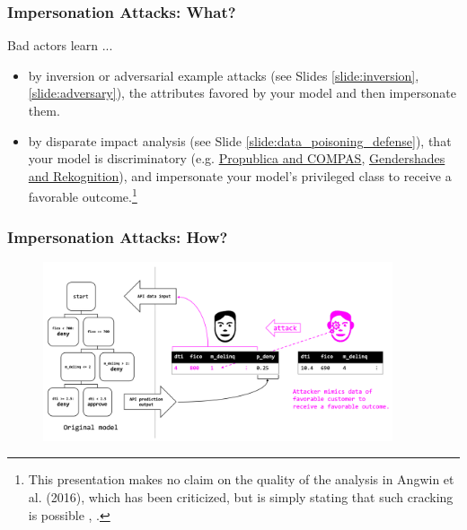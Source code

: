 \documentclass[11pt,
               aspectratio=169,
               hyperref={colorlinks}
               ]{beamer}
\begin{document}
			\begin{frame}
		
				\frametitle{Impersonation Attacks: \textbf{What?}}		
Bad actors learn ... 
				\begin{itemize}
				\large
					\item by inversion or adversarial example attacks (see Slides \ref{slide:inversion}, \ref{slide:adversary}), the attributes favored by your model and then impersonate them.
					\item by disparate impact analysis (see Slide \ref{slide:data_poisoning_defense}), that your model is discriminatory (e.g. \href{https://www.propublica.org/article/machine-bias-risk-assessments-in-criminal-sentencing}{Propublica and COMPAS}, \href{https://medium.com/@Joy.Buolamwini/response-racial-and-gender-bias-in-amazon-rekognition-commercial-ai-system-for-analyzing-faces-a289222eeced}{Gendershades and Rekognition}), and impersonate your model's privileged class to receive a favorable outcome.\footnote{This presentation makes no claim on the quality of the analysis in Angwin et al. (2016), which has been criticized, but is simply stating that such cracking is possible \cite{angwin16,}, \cite{flores2016false}.}
				\end{itemize}
				
			\end{frame}

			\begin{frame}
		
				\frametitle{Impersonation Attacks: \textbf{How?}}		
			
				\begin{figure}[htb]
					\begin{center}
						\includegraphics[height=150pt]{../img/imperson.PNG}
					\end{center}
				\end{figure}	
				
			\end{frame}
			
\end{document}
